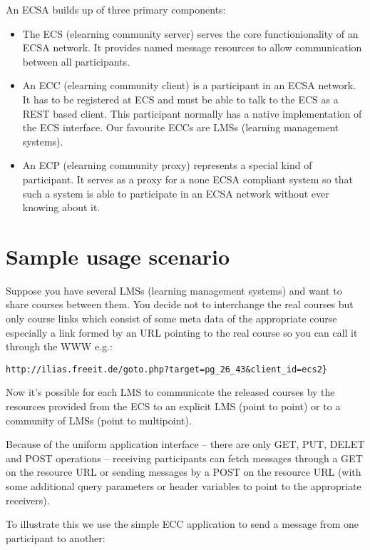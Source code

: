 An ECSA builds up of three primary components:
\begin{itemize}
  \item The ECS (elearning community server) serves the core functionionality of an ECSA network. It provides
  named message resources to allow communication between all participants. 
  \item An ECC (elearning community client)
  is a participant in an ECSA
  network. It has to be registered at ECS and must be able to talk to the ECS
  as a REST based client. This participant normally has a native implementation
  of the ECS interface. Our favourite ECCs are LMSs (learning management
  systems).
  \item An ECP (elearning community proxy)
  represents a special kind of participant. It serves as a proxy for a none
  ECSA compliant system so that such a system is able to participate in an ECSA
  network without ever knowing about it. 
\end{itemize}
 
\section{Sample usage scenario}

Suppose you have several LMSs (learning management systems) and want to share courses between them. You decide not
to interchange the real courses but only course links which consist of some
meta data of the appropriate course especially a link formed by an URL pointing
to the real course so you can call it through the WWW e.g.: 

\verb!http://ilias.freeit.de/goto.php?target=pg_26_43&client_id=ecs2}!

Now it's possible for each LMS to communicate the released courses by the
resources provided from the ECS to an explicit LMS (point to point) or to a
community of LMSs (point to multipoint). 
         
Because of  the uniform application interface -- there are only GET,
PUT, DELET  and POST operations -- receiving participants can fetch
messages through a GET on the resource URL or sending messages
by a POST on the resource URL (with some additional query parameters
or header variables to point to the appropriate receivers).
               
To illustrate this we use the simple ECC application  to
send a message from one participant to another:
                  

